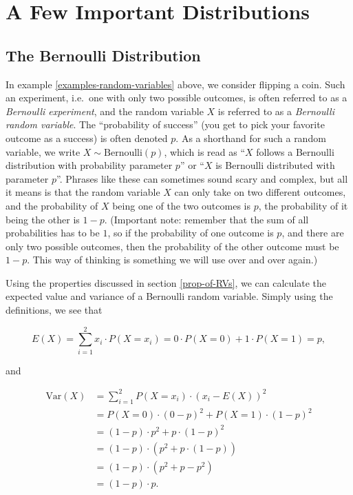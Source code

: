 \documentclass[]{book}
\theoremstyle{definition}
\theoremstyle{definition}
\theoremstyle{definition}
\theoremstyle{remark}
\begin{document}
\hypertarget{a-few-important-distributions}{%
\section{A Few Important Distributions}\label{a-few-important-distributions}}

\hypertarget{the-bernoulli-distribution}{%
\subsection{The Bernoulli Distribution}\label{the-bernoulli-distribution}}

In example \ref{examples-random-variables} above, we consider flipping a coin. Such an experiment, i.e.~one with only two possible outcomes, is often referred to as a \emph{Bernoulli experiment}, and the random variable \(X\) is referred to as a \emph{Bernoulli random variable}. The ``probability of success'' (you get to pick your favorite outcome as a success) is often denoted \(p\). As a shorthand for such a random variable, we write \(X \sim \text{Bernoulli}(p)\), which is read as ``\(X\) follows a Bernoulli distribution with probability parameter \(p\)'' or ``\(X\) is Bernoulli distributed with parameter \(p\)''. Phrases like these can sometimes sound scary and complex, but all it means is that the random variable \(X\) can only take on two different outcomes, and the probability of \(X\) being one of the two outcomes is \(p\), the probability of it being the other is \(1-p\). (Important note: remember that the sum of all probabilities has to be \(1\), so if the probability of one outcome is \(p\), and there are only two possible outcomes, then the probability of the other outcome must be \(1-p\). This way of thinking is something we will use over and over again.)

Using the properties discussed in section \ref{prop-of-RVs}, we can calculate the expected value and variance of a Bernoulli random variable. Simply using the definitions, we see that

\[
  E(X) = \sum_{i=1}^2 x_i \cdot P(X = x_i) = 0 \cdot P(X = 0) + 1 \cdot P(X = 1) = p,
\]

and

\begin{align*}
  \text{Var}(X) &= \sum_{i=1}^2 P(X = x_i) \cdot (x_i - E(X))^2 \\
          &= P(X = 0)\cdot (0 - p)^2 + P(X = 1)\cdot (1 - p)^2 \\
          &= (1 - p)\cdot p^2 + p\cdot (1 - p)^2 \\
          &= (1-p)\cdot(p^2 + p\cdot(1-p)) \\
          &= (1-p)\cdot(p^2 + p - p^2) \\
          &= (1-p)\cdot p.
\end{align*}
\end{document}
